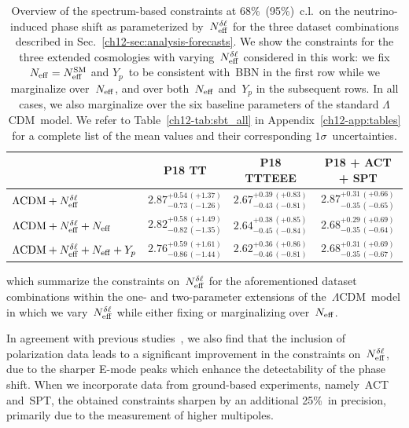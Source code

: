 \begin{table}
	\centering
	\begin{tabular}{l c c c}
			\toprule
															& P18 TT										& P18 TTTEEE									& P18 + ACT + SPT								\\
			\midrule[0.065em]
		$\Lambda\mathrm{CDM} + N_\mathrm{eff}^{\delta\ell}$ 				& $2.87^{+0.54\, (+1.37)}_{-0.73\, (-1.26)}$	& $2.67^{+0.39\, (+0.83)}_{-0.43\, (-0.81)}$	& $2.87^{+0.31\, (+0.66)}_{-0.35\, (-0.65)}$	\\[4pt]
		$\Lambda\mathrm{CDM} + N_\mathrm{eff}^{\delta\ell} + N_\mathrm{eff}$ 		& $2.82^{+0.58\, (+1.49)}_{-0.82\, (-1.35)}$	& $2.64^{+0.38\, (+0.85)}_{-0.45\, (-0.84)}$	& $2.68^{+0.29\, (+0.69)}_{-0.35\, (-0.64)}$	\\[4pt]
		$\Lambda\mathrm{CDM} + N_\mathrm{eff}^{\delta\ell} + N_\mathrm{eff} + Y_p$	& $2.76^{+0.59\, (+1.61)}_{-0.86\, (-1.44)}$	& $2.62^{+0.36\, (+0.86)}_{-0.46\, (-0.81)}$	& $2.68^{+0.31\, (+0.69)}_{-0.35\, (-0.67)}$	\\[2pt]
			\bottomrule
	\end{tabular}
	\caption[Spectrum-based neutrino phase shift constraints]{Overview of the spectrum-based constraints at 68\%~(95\%)~c.l.\ on the neutrino-induced phase shift as parameterized by~$N_\mathrm{eff}^{\delta\ell}$ for the three dataset combinations described in Sec.~\ref{ch12-sec:analysis-forecasts}. We show the constraints for the three extended cosmologies with varying~$N_\mathrm{eff}^{\delta\ell}$ considered in this work: we fix $N_\mathrm{eff} = N_\mathrm{eff}^\mathrm{SM}$ and $Y_p$~to be consistent with~BBN in the first row while we marginalize over~$N_\mathrm{eff}$, and over both~$N_\mathrm{eff}$ and~$Y_p$ in the subsequent rows. In all cases, we also marginalize over the six baseline parameters of the standard $\Lambda$CDM~model. We refer to Table~\ref{ch12-tab:sbt_all} in Appendix~\ref{ch12-app:tables} for a complete list of the mean values and their corresponding $1\sigma$~uncertainties.}
	\label{ch12-tab:N_deltaell_analysis}
\end{table}
which summarize the constraints on~$N_\mathrm{eff}^{\delta\ell}$ for the aforementioned dataset combinations within the one- and two-parameter extensions of the~$\Lambda$CDM~model in which we vary~$N_\mathrm{eff}^{\delta\ell}$ while either fixing or marginalizing over~$N_\mathrm{eff}$.

In agreement with previous studies~\cite{Baumann:2015rya, Brust:2017nmv, Kreisch:2019yzn, Forastieri:2019cuf, Blinov:2020hmc, Das:2020xke, Brinckmann:2020bcn}, we also find that the inclusion of polarization data leads to a significant improvement in the constraints on~$N_\mathrm{eff}^{\delta\ell}$, due to the sharper E-mode peaks which enhance the detectability of the phase shift. When we incorporate data from ground-based experiments, namely~ACT and~SPT, the obtained constraints sharpen by an additional 25\%~in precision, primarily due to the measurement of higher multipoles.

